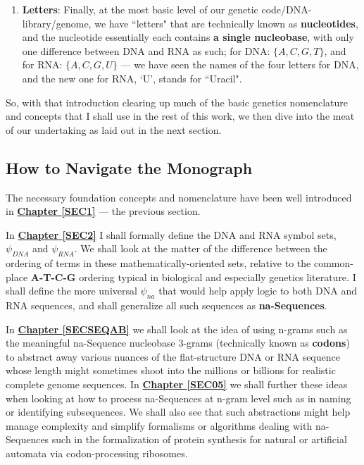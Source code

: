 \documentclass[a4paper, 18pt]{book} %
\begin{document}
\begin{enumerate}
\item \textbf{Letters}: Finally, at the most basic level of our genetic code/DNA-library/genome, we have ``letters" that are technically known as \textbf{nucleotides}, and the nucleotide essentially each contains \textbf{a single nucleobase}, with only one difference between DNA and RNA as such; for DNA: $\{A, C, G, T\}$, and for RNA: $\{A, C, G, U\}$ --- we have seen the names of the four letters for DNA, and the new one for RNA, `U', stands for ``Uracil".
\end{enumerate}


So, with that introduction clearing up much of the basic genetics nomenclature and concepts that I shall use in the rest of this work, we then dive into the meat of our undertaking as laid out in the next section.

\subsection{How to Navigate the Monograph}

The necessary foundation concepts and nomenclature have been well introduced in \textbf{\hyperref[SEC1]{Chapter \ref{SEC1}}} --- the previous section.

In \textbf{\hyperref[SEC2]{Chapter \ref{SEC2}}} I shall formally define the DNA and RNA symbol sets, $\psi_{DNA}$ and $\psi_{RNA}$. We shall look at the matter of the difference between the ordering of terms in these mathematically-oriented sets, relative to the common-place \textbf{A-T-C-G} ordering typical in biological and especially genetics literature. I shall define the more universal $\psi_{na}$ that would help apply logic to both DNA and RNA sequences, and shall generalize all such sequences as \textbf{na-Sequences}.

In \textbf{\hyperref[SECSEQAB]{Chapter \ref{SECSEQAB}}} we shall look at the idea of using n-grams such as the meaningful na-Sequence nucleobase 3-grams (technically known as \textbf{codons}) to abstract away various nuances of the flat-structure DNA or RNA sequence whose length might sometimes shoot into the millions or billions for realistic complete genome sequences. In \textbf{\hyperref[SEC05]{Chapter \ref{SEC05}}} we shall further these ideas when looking at how to process na-Sequences at n-gram level such as in naming or identifying subsequences. We shall also see that such abstractions might help manage complexity and simplify formalisms or algorithms dealing with na-Sequences such in the formalization of protein synthesis for natural or artificial automata via codon-processing ribosomes.
\end{document}
